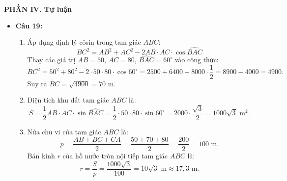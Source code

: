\documentclass[12pt,a4paper]{article}
\begin{document}
\vspace{0.2cm}
\textbf{PHẦN IV. Tự luận}
\begin{itemize}[leftmargin=0.6cm, itemsep=6pt]
    \item \textbf{Câu 19:}
    \begin{enumerate}
        \item Áp dụng định lý côsin trong tam giác $ABC$:
        \[
        BC^2 = AB^2 + AC^2 - 2AB \cdot AC \cdot \cos \widehat{BAC}
        \]
        Thay các giá trị $AB = 50$, $AC = 80$, $\widehat{BAC} = 60^\circ$ vào công thức:
        \[
        BC^2 = 50^2 + 80^2 - 2 \cdot 50 \cdot 80 \cdot \cos 60^\circ = 2500 + 6400 - 8000 \cdot \dfrac{1}{2} = 8900 - 4000 = 4900.
        \]
        Suy ra $BC = \sqrt{4900} = 70\text{ m}$.
        \item Diện tích khu đất tam giác $ABC$ là:
        \[
        S = \dfrac{1}{2} AB \cdot AC \cdot \sin \widehat{BAC} = \dfrac{1}{2} \cdot 50 \cdot 80 \cdot \sin 60^\circ = 2000 \cdot \dfrac{\sqrt{3}}{2} = 1000\sqrt{3}\text{ m}^2.
        \]
        \item Nửa chu vi của tam giác $ABC$ là:
        \[
        p = \dfrac{AB + BC + CA}{2} = \dfrac{50 + 70 + 80}{2} = \dfrac{200}{2} = 100\text{ m}.
        \]
        Bán kính $r$ của hồ nước tròn nội tiếp tam giác $ABC$ là:
        \[
        r = \dfrac{S}{p} = \dfrac{1000\sqrt{3}}{100} = 10\sqrt{3}\text{ m} \approx 17{,}3\text{ m}.
        \]
    \end{enumerate}


\end{itemize}
\end{document}
